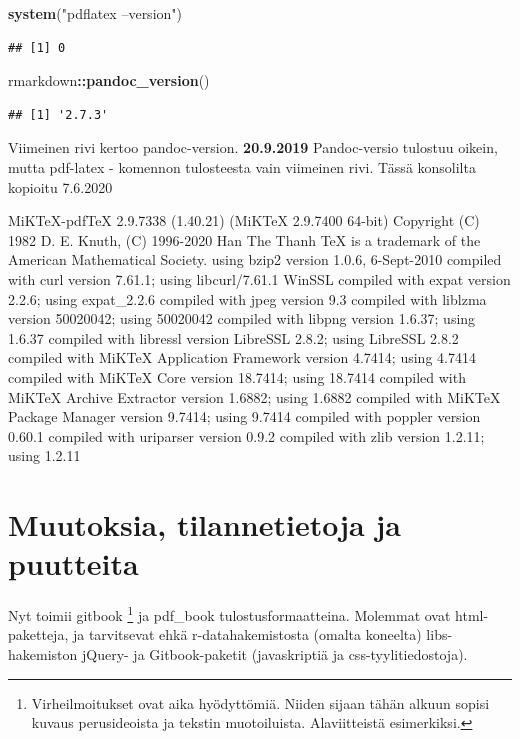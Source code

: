 \documentclass[
  finnish,
]{book}
\newenvironment{Shaded}{\begin{snugshade}}{\end{snugshade}}
\newcommand{\KeywordTok}[1]{\textcolor[rgb]{0.13,0.29,0.53}{\textbf{#1}}}
\newcommand{\NormalTok}[1]{#1}
\newcommand{\OperatorTok}[1]{\textcolor[rgb]{0.81,0.36,0.00}{\textbf{#1}}}
\newcommand{\StringTok}[1]{\textcolor[rgb]{0.31,0.60,0.02}{#1}}
\begin{document}
\begin{Shaded}
\begin{Highlighting}[]
\KeywordTok{system}\NormalTok{(}\StringTok{"pdflatex --version"}\NormalTok{)}
\end{Highlighting}
\end{Shaded}

\begin{verbatim}
## [1] 0
\end{verbatim}

\begin{Shaded}
\begin{Highlighting}[]
\NormalTok{rmarkdown}\OperatorTok{::}\KeywordTok{pandoc_version}\NormalTok{()}
\end{Highlighting}
\end{Shaded}

\begin{verbatim}
## [1] '2.7.3'
\end{verbatim}

Viimeinen rivi kertoo pandoc-version.
\textbf{20.9.2019} Pandoc-versio tulostuu oikein, mutta pdf-latex - komennon tulosteesta
vain viimeinen rivi. Tässä konsolilta kopioitu 7.6.2020

MiKTeX-pdfTeX 2.9.7338 (1.40.21) (MiKTeX 2.9.7400 64-bit)
Copyright (C) 1982 D. E. Knuth, (C) 1996-2020 Han The Thanh
TeX is a trademark of the American Mathematical Society.
using bzip2 version 1.0.6, 6-Sept-2010
compiled with curl version 7.61.1; using libcurl/7.61.1 WinSSL
compiled with expat version 2.2.6; using expat\_2.2.6
compiled with jpeg version 9.3
compiled with liblzma version 50020042; using 50020042
compiled with libpng version 1.6.37; using 1.6.37
compiled with libressl version LibreSSL 2.8.2; using LibreSSL 2.8.2
compiled with MiKTeX Application Framework version 4.7414; using 4.7414
compiled with MiKTeX Core version 18.7414; using 18.7414
compiled with MiKTeX Archive Extractor version 1.6882; using 1.6882
compiled with MiKTeX Package Manager version 9.7414; using 9.7414
compiled with poppler version 0.60.1
compiled with uriparser version 0.9.2
compiled with zlib version 1.2.11; using 1.2.11

\hypertarget{muutoksia-tilannetietoja-ja-puutteita}{%
\section{Muutoksia, tilannetietoja ja puutteita}\label{muutoksia-tilannetietoja-ja-puutteita}}

Nyt toimii gitbook \footnote{Virheilmoitukset ovat aika hyödyttömiä. Niiden sijaan tähän alkuun sopisi kuvaus perusideoista ja tekstin muotoiluista. Alaviitteistä esimerkiksi.} ja pdf\_book tulostusformaatteina. Molemmat ovat html-paketteja, ja tarvitsevat ehkä r-datahakemistosta (omalta koneelta) libs-hakemiston jQuery- ja Gitbook-paketit (javaskriptiä ja css-tyylitiedostoja).
\end{document}
